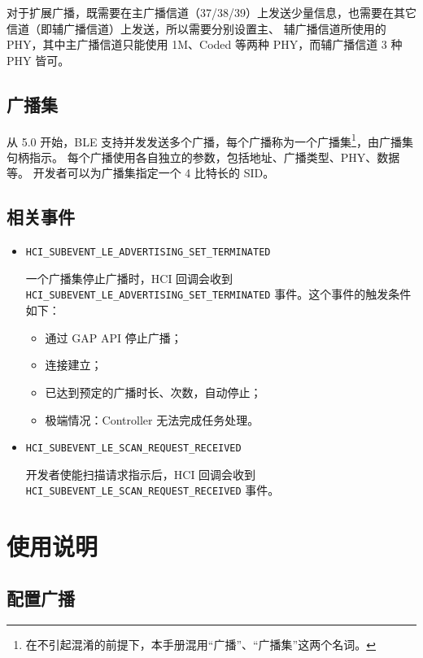 \documentclass[
  12pt,
]{book}
\providecommand{\tightlist}{%
  \setlength{\itemsep}{0pt}\setlength{\parskip}{0pt}}
\begin{document}
对于扩展广播，既需要在主广播信道（37/38/39）上发送少量信息，也需要在其它信道（即辅广播信道）上发送，所以需要分别设置主、
辅广播信道所使用的 PHY，其中主广播信道只能使用 1M、Coded 等两种 PHY，而辅广播信道 3 种 PHY 皆可。

\hypertarget{ux5e7fux64adux96c6}{%
\subsection{广播集}\label{ux5e7fux64adux96c6}}

从 5.0 开始，BLE 支持并发发送多个广播，每个广播称为一个广播集\footnote{在不引起混淆的前提下，本手册混用``广播''、``广播集''这两个名词。}，由广播集句柄指示。
每个广播使用各自独立的参数，包括地址、广播类型、PHY、数据等。
开发者可以为广播集指定一个 4 比特长的 SID。

\hypertarget{ux76f8ux5173ux4e8bux4ef6}{%
\subsection{相关事件}\label{ux76f8ux5173ux4e8bux4ef6}}

\begin{itemize}
\item
  \texttt{HCI\_SUBEVENT\_LE\_ADVERTISING\_SET\_TERMINATED}

  一个广播集停止广播时，HCI 回调会收到 \texttt{HCI\_SUBEVENT\_LE\_ADVERTISING\_SET\_TERMINATED} 事件。这个事件的触发条件如下：

  \begin{itemize}
  \tightlist
  \item
    通过 GAP API 停止广播；
  \item
    连接建立；
  \item
    已达到预定的广播时长、次数，自动停止；
  \item
    极端情况：Controller 无法完成任务处理。
  \end{itemize}
\item
  \texttt{HCI\_SUBEVENT\_LE\_SCAN\_REQUEST\_RECEIVED}

  开发者使能扫描请求指示后，HCI 回调会收到 \texttt{HCI\_SUBEVENT\_LE\_SCAN\_REQUEST\_RECEIVED} 事件。
\end{itemize}

\hypertarget{ux4f7fux7528ux8bf4ux660e}{%
\section{使用说明}\label{ux4f7fux7528ux8bf4ux660e}}

\hypertarget{ux914dux7f6eux5e7fux64ad}{%
\subsection{配置广播}\label{ux914dux7f6eux5e7fux64ad}}
\end{document}
